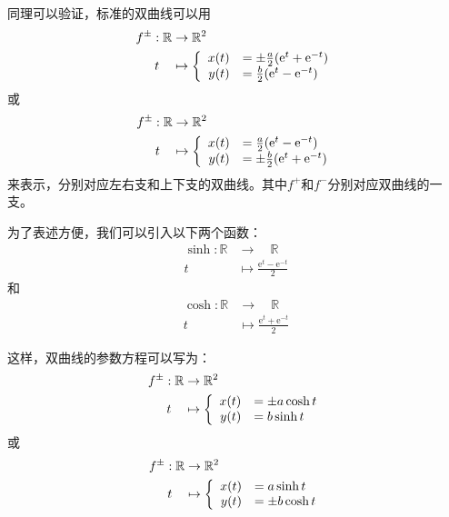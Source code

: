 \documentclass[12pt,UTF8]{ctexbook}
\theoremstyle{definition}
\theoremstyle{plain}
\begin{document}
同理可以验证，标准的双曲线可以用
\begin{align*}
    f^{\pm}: \mathbb{R} &\rightarrow \mathbb{R}^2 \\
    t\quad &\mapsto\left\{
        \begin{array}[]{rl}
            x(t) &= \pm\frac{a}{2}(\mathrm{e}^t + \mathrm{e}^{-t}) \\
            y(t) &= \frac{b}{2}(\mathrm{e}^t - \mathrm{e}^{-t}) \\
        \end{array}
    \right.
\end{align*}
或
\begin{align*}
    f^{\pm}: \mathbb{R} &\rightarrow \mathbb{R}^2 \\
    t\quad &\mapsto\left\{
        \begin{array}[]{rl}
            x(t) &= \frac{a}{2}(\mathrm{e}^t - \mathrm{e}^{-t}) \\
            y(t) &= \pm\frac{b}{2}(\mathrm{e}^t + \mathrm{e}^{-t}) \\
        \end{array}
    \right.
\end{align*}
来表示，分别对应左右支和上下支的双曲线。其中$f^+$和$f^-$分别对应双曲线的一支。

为了表述方便，我们可以引入以下两个函数：
\begin{align*}
    \sinh: \mathbb{R} &\rightarrow \quad \mathbb{R} \\
    t\; &\mapsto \frac{\mathrm{e}^t - \mathrm{e}^{-t}}{2} 
\end{align*}
和
\begin{align*}
    \cosh: \mathbb{R} &\rightarrow \quad \mathbb{R} \\
    t\; &\mapsto \frac{\mathrm{e}^t + \mathrm{e}^{-t}}{2} 
\end{align*}

这样，双曲线的参数方程可以写为：
\begin{align*}
    f^{\pm}: \mathbb{R} &\rightarrow \mathbb{R}^2 \\
    t\quad &\mapsto\left\{
        \begin{array}[]{rl}
            x(t) &= \pm a\cosh{t} \\
            y(t) &= b\sinh{t} \\
        \end{array}
    \right.
\end{align*}
或
\begin{align*}
    f^{\pm}: \mathbb{R} &\rightarrow \mathbb{R}^2 \\
    t\quad &\mapsto\left\{
        \begin{array}[]{rl}
            x(t) &= a\sinh{t} \\
            y(t) &= \pm b\cosh{t} \\
        \end{array}
    \right.
\end{align*}
\end{document}

